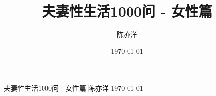 \begin{enumerate}
\usepackage{amsmath, amssymb, amsthm}
\usepackage{mathrsfs}

\newtheorem{theorem}{定理}[chapter]
\newtheorem{definition}{定义}[chapter]
\newtheorem{lemma}{引理}[chapter]
\newtheorem{corollary}{推论}[chapter]
\newtheorem{example}{例}[chapter]

\usepackage{makeidx}
\makeindex

\newenvironment{abstract}{
    \cleardoublepage
    \thispagestyle{empty}
    \begin{center}
        \textbf{\zihao{1} 摘要}
    \end{center}
    \vspace{1cm}
    \itshape
}{
    \normalfont
}

\newcommand{\keywords}[1]{
    \vspace{1cm}
    \noindent\textbf{关键词：} #1
}

\usepackage{hyperref}

\setcounter{tocdepth}{3}
\setcounter{secnumdepth}{3}

\usepackage{titling}

\title{\hei{} 夫妻性生活1000问 - 女性篇}
\author{\song{} 陈亦洋}
\date{\song{} \today}



\begin{titlepage}
    \begin{center}
        \vspace*{6cm}
        \hei{} 夫妻性生活1000问 - 女性篇
        \vspace*{3cm}
        \song{} 陈亦洋
        \vspace*{3cm}
        \song{} \today
    \end{center}
\end{titlepage}


\end{enumerate}
